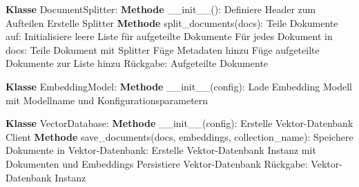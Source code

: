    \begin{algorithm}
    \caption{Dokumenten-Splitter erstellen und Dokumente aufteilen}
    \begin{algorithmic}[1]
    \STATE \textbf{Klasse} DocumentSplitter:
    \STATE \textbf{Methode} \_\_init\_\_():
    \STATE \quad Definiere Header zum Aufteilen
    \STATE \quad Erstelle Splitter
    \STATE \textbf{Methode} split\_documents(docs):
    \STATE \quad Teile Dokumente auf:
    \STATE \quad \quad Initialisiere leere Liste für aufgeteilte Dokumente
    \STATE \quad \quad Für jedes Dokument in docs:
    \STATE \quad \quad \quad Teile Dokument mit Splitter
    \STATE \quad \quad \quad Füge Metadaten hinzu
    \STATE \quad \quad \quad Füge aufgeteilte Dokumente zur Liste hinzu
    \STATE \quad Rückgabe: Aufgeteilte Dokumente
    \end{algorithmic}
    \label{splitter}
    \end{algorithm}
    
    \begin{algorithm}
    \caption{Embedding-Modell erstellen}
    \begin{algorithmic}[1]
    \STATE \textbf{Klasse} EmbeddingModel:
    \STATE \textbf{Methode} \_\_init\_\_(config):
    \STATE \quad Lade Embedding Modell mit Modellname und Konfigurationsparametern
    \end{algorithmic}
    \label{embedding}
    \end{algorithm}
    
    \begin{algorithm}
    \caption{Vektor-Datenbank erstellen und Dokumente speichern}
    \begin{algorithmic}[1]
    \STATE \textbf{Klasse} VectorDatabase:
    \STATE \textbf{Methode} \_\_init\_\_(config):
    \STATE \quad Erstelle Vektor-Datenbank Client
    \STATE \textbf{Methode} save\_documents(docs, embeddings, collection\_name):
    \STATE \quad Speichere Dokumente in Vektor-Datenbank:
    \STATE \quad \quad Erstelle Vektor-Datenbank Instanz mit Dokumenten und Embeddings
    \STATE \quad \quad Persistiere Vektor-Datenbank
    \STATE \quad Rückgabe: Vektor-Datenbank Instanz
    \end{algorithmic}
    \label{VectorDB}
    \end{algorithm}
    
    

